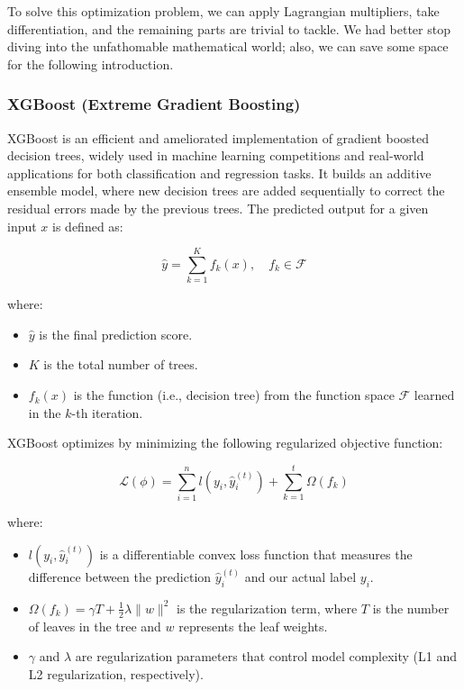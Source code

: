 \documentclass{article}
\begin{document}
To solve this optimization problem, we can apply Lagrangian multipliers, take differentiation, and the remaining parts are trivial to tackle. We had better stop diving into the unfathomable mathematical world; also, we can save some space for the following introduction.

\subsubsection{XGBoost (Extreme Gradient Boosting)}
XGBoost is an efficient and ameliorated implementation of gradient boosted decision trees, widely used in machine learning competitions and real-world applications for both classification and regression tasks. 
It builds an additive ensemble model, where new decision trees are added sequentially to correct the residual errors made by the previous trees. 
The predicted output for a given input \( x \) is defined as:

\begin{equation}
    \hat{y} = \sum_{k=1}^K f_k(x), \quad f_k \in \mathcal{F}
\end{equation}

\noindent where:
\begin{itemize}
    \item \( \hat{y} \) is the final prediction score.
    \item \( K \) is the total number of trees.
    \item \( f_k(x) \) is the function (i.e., decision tree) from the function space \( \mathcal{F} \) learned in the \( k \)-th iteration.
\end{itemize}
XGBoost optimizes by minimizing the following regularized objective function:

\begin{equation}
    \mathcal{L}(\phi) = \sum_{i=1}^n l(y_i, \hat{y}_i^{(t)}) + \sum_{k=1}^t \Omega(f_k)
\end{equation}

\noindent where:
\begin{itemize}
    \item \( l(y_i, \hat{y}_i^{(t)}) \) is a differentiable convex loss function that measures the difference between the prediction \( \hat{y}_i^{(t)} \) and our actual label \( y_i \).
    \item \( \Omega(f_k) = \gamma T + \frac{1}{2} \lambda \| w \|^2 \) is the regularization term, where \( T \) is the number of leaves in the tree and \( w \) represents the leaf weights.
    \item \( \gamma \) and \( \lambda \) are regularization parameters that control model complexity (L1 and L2 regularization, respectively).
\end{itemize}
\end{document}
